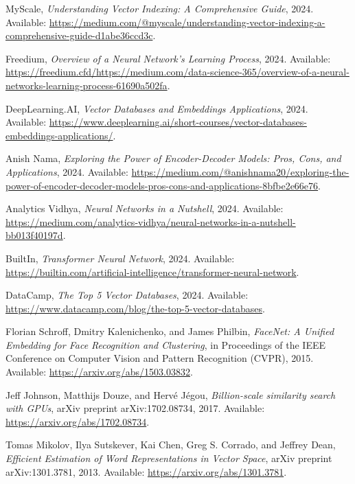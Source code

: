 \documentclass[12pt,a4paper,twoside,openright,justified]{book}
\begin{document}
\begin{thebibliography}{99}
 MyScale, \textit{Understanding Vector Indexing: A Comprehensive Guide}, 2024. Available: \url{https://medium.com/@myscale/understanding-vector-indexing-a-comprehensive-guide-d1abe36ccd3c}.

 Freedium, \textit{Overview of a Neural Network's Learning Process}, 2024. Available: \url{https://freedium.cfd/https://medium.com/data-science-365/overview-of-a-neural-networks-learning-process-61690a502fa}.

 DeepLearning.AI, \textit{Vector Databases and Embeddings Applications}, 2024. Available: \url{https://www.deeplearning.ai/short-courses/vector-databases-embeddings-applications/}.

 Anish Nama, \textit{Exploring the Power of Encoder-Decoder Models: Pros, Cons, and Applications}, 2024. Available: \url{https://medium.com/@anishnama20/exploring-the-power-of-encoder-decoder-models-pros-cons-and-applications-8bfbe2e66e76}.

 Analytics Vidhya, \textit{Neural Networks in a Nutshell}, 2024. Available: \url{https://medium.com/analytics-vidhya/neural-networks-in-a-nutshell-bb013f40197d}.

 BuiltIn, \textit{Transformer Neural Network}, 2024. Available: \url{https://builtin.com/artificial-intelligence/transformer-neural-network}.

 DataCamp, \textit{The Top 5 Vector Databases}, 2024. Available: \url{https://www.datacamp.com/blog/the-top-5-vector-databases}.

 Florian Schroff, Dmitry Kalenichenko, and James Philbin, \textit{FaceNet: A Unified Embedding for Face Recognition and Clustering}, in Proceedings of the IEEE Conference on Computer Vision and Pattern Recognition (CVPR), 2015. Available: \url{https://arxiv.org/abs/1503.03832}.

 Jeff Johnson, Matthijs Douze, and Hervé Jégou, \textit{Billion-scale similarity search with GPUs}, arXiv preprint arXiv:1702.08734, 2017. Available: \url{https://arxiv.org/abs/1702.08734}.

 Tomas Mikolov, Ilya Sutskever, Kai Chen, Greg S. Corrado, and Jeffrey Dean, \textit{Efficient Estimation of Word Representations in Vector Space}, arXiv preprint arXiv:1301.3781, 2013. Available: \url{https://arxiv.org/abs/1301.3781}.


\end{thebibliography}
\end{document}
